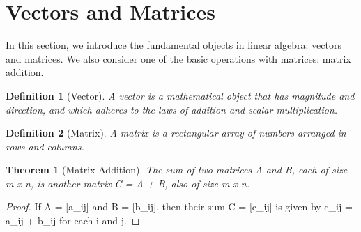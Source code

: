\documentclass{article}
\newtheorem{definition}{Definition}[section]
\newtheorem{theorem}{Theorem}[section]
\begin{document}
\section{Vectors and Matrices}
In this section, we introduce the fundamental objects in linear algebra: vectors and matrices.
We also consider one of the basic operations with matrices: matrix addition.

\begin{definition}[Vector]
A vector is a mathematical object that has magnitude and direction, and which adheres to the laws of addition and scalar multiplication.
\end{definition}

\begin{definition}[Matrix]
A matrix is a rectangular array of numbers arranged in rows and columns.
\end{definition}

\begin{theorem}[Matrix Addition]
The sum of two matrices A and B, each of size m x n, is another matrix C = A + B, also of size m x n.
\end{theorem}

\begin{proof}
If A = [a_{ij}] and B = [b_{ij}], then their sum C = [c_{ij}] is given by c_{ij} = a_{ij} + b_{ij} for each i and j.
\end{proof}
\end{document}

